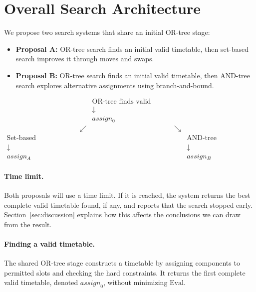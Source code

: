 \ifdefined\savedparindent\else\newlength{\savedparindent}\fi
\ifdefined\savedparskip\else\newlength{\savedparskip}\fi
\setlength{\savedparindent}{\parindent}
\setlength{\savedparskip}{\parskip}
\setlength{\parindent}{0pt}
\setlength{\parskip}{0.6\baselineskip plus 2pt}

\section{Overall Search Architecture}
\label{sec:architecture}

We propose two search systems that share an initial
OR-tree stage:
\begin{itemize}
  \item \textbf{Proposal A:} OR-tree search finds an initial valid
  timetable, then set-based search improves it through
  moves and swaps.
  \item \textbf{Proposal B:} OR-tree search finds an initial valid
  timetable, then AND-tree search explores alternative
  assignments using branch-and-bound.
\end{itemize}
\[
\boxed{\begin{array}{ccccc}
&&\text{OR-tree finds valid solution}&&\\[-1pt]
&&\downarrow&&\\[-1pt]
&&assign_{\mathrm{0}}&&\\[-1pt]
&\swarrow&&\searrow&\\[-1pt]
\text{Set-based improvement}&&&&\text{AND-tree optimization}\\[-1pt]
\downarrow&&&&\downarrow\\[-1pt]
assign_{A}&&&&assign_{B}
\end{array}}
\]

\paragraph{Time limit.} Both proposals will use a time limit. If it is reached,
the system returns the best complete valid timetable found,
if any, and reports that the search stopped early.
Section~\ref{sec:discussion} explains how this affects
the conclusions we can draw from the result.

\paragraph{Finding a valid timetable.} The shared OR-tree stage constructs a timetable by assigning
components to permitted slots and checking the hard
constraints. It returns the first complete valid timetable,
denoted $\mathit{assign}_0$, without minimizing
$\mathrm{Eval}$.

